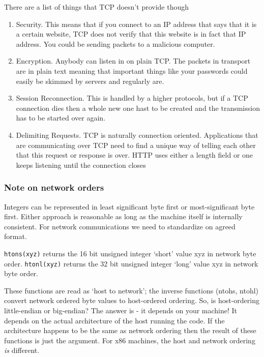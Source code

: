 \documentclass[]{article}
\begin{document}
There are a list of things that TCP doesn't provide though

\begin{enumerate}
\item
  Security. This means that if you connect to an IP address that says
  that it is a certain website, TCP does not verify that this website is
  in fact that IP address. You could be sending packets to a malicious
  computer.
\item
  Encryption. Anybody can listen in on plain TCP. The packets in
  transport are in plain text meaning that important things like your
  passwords could easily be skimmed by servers and regularly are.
\item
  Session Reconnection. This is handled by a higher protocols, but if a
  TCP connection dies then a whole new one hast to be created and the
  transmission has to be started over again.
\item
  Delimiting Requests. TCP is naturally connection oriented.
  Applications that are communicating over TCP need to find a unique way
  of telling each other that this request or response is over. HTTP uses
  either a length field or one keeps listening until the connection
  closes
\end{enumerate}

\subsubsection{Note on network orders}\label{note-on-network-orders}

Integers can be represented in least significant byte first or
most-significant byte first. Either approach is reasonable as long as
the machine itself is internally consistent. For network communications
we need to standardize on agreed format.

\texttt{htons(xyz)} returns the 16 bit unsigned integer `short' value
xyz in network byte order. \texttt{htonl(xyz)} returns the 32 bit
unsigned integer `long' value xyz in network byte order.

These functions are read as `host to network'; the inverse functions
(ntohs, ntohl) convert network ordered byte values to host-ordered
ordering. So, is host-ordering little-endian or big-endian? The answer
is - it depends on your machine! It depends on the actual architecture
of the host running the code. If the architecture happens to be the same
as network ordering then the result of these functions is just the
argument. For x86 machines, the host and network ordering \emph{is}
different.
\end{document}

